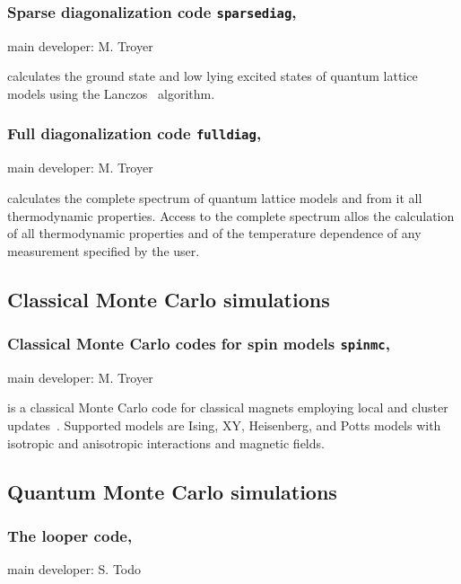 \documentclass[12pt]{iopart}
\begin{document}
\subsubsection{Sparse diagonalization code {\tt sparsediag},} main developer: M. Troyer

\smallskip

 calculates the ground state and low lying excited states of quantum lattice models using the
Lanczos~\cite{lanczos} algorithm.


\subsubsection{Full diagonalization code {\tt fulldiag},} main developer: M. Troyer

\smallskip

 calculates the complete
spectrum of quantum lattice models and from it all thermodynamic
properties. Access to the complete spectrum allos the calculation of all thermodynamic properties and of the temperature dependence of any measurement specified by the user.



\subsection{Classical Monte Carlo simulations} 

\subsubsection{Classical Monte Carlo codes for spin models {\tt spinmc},} main developer: M. Troyer

\smallskip

 is a classical Monte Carlo code for classical magnets employing local and cluster
updates~\cite{Swendsen87,Wolff89}. Supported models are Ising, XY, Heisenberg, and Potts models with isotropic and anisotropic interactions and magnetic fields.

\subsection{Quantum Monte Carlo simulations} 

\subsubsection{The looper code,} main developer: S. Todo
\end{document}
